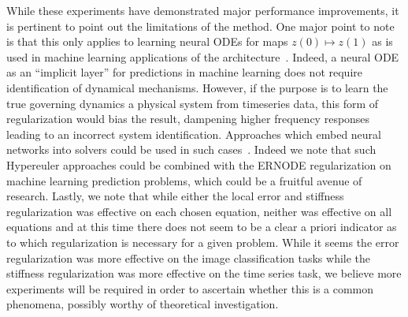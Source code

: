 While these experiments have demonstrated major performance improvements, it is pertinent to point out the limitations of the method. One major point to note is that this only applies to learning neural ODEs for maps $z(0) \mapsto z(1)$ as is used in machine learning applications of the architecture~\citep{chen2018neural}. Indeed, a neural ODE as an ``implicit layer'' for predictions in machine learning does not require identification of dynamical mechanisms. However, if the purpose is to learn the true governing dynamics a physical system from timeseries data, this form of regularization would bias the result, dampening higher frequency responses leading to an incorrect system identification. Approaches which embed neural networks into solvers could be used in such cases~\citep{shen2020deep,poli2020hypersolvers}. Indeed we note that such Hypereuler approaches could be combined with the ERNODE regularization on machine learning prediction problems, which could be a fruitful avenue of research. Lastly, we note that while either the local error and stiffness regularization was effective on each chosen equation, neither was effective on all equations and at this time there does not seem to be a clear a priori indicator as to which regularization is necessary for a given problem. While it seems the error regularization was more effective on the image classification tasks while the stiffness regularization was more effective on the time series task, we believe more experiments will be required in order to ascertain whether this is a common phenomena, possibly worthy of theoretical investigation.
